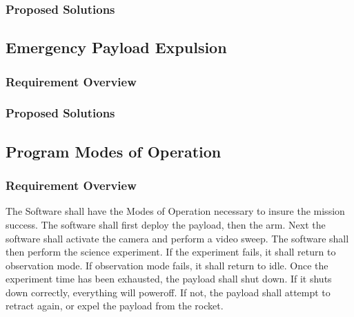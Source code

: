 \documentclass[letterpaper,10pt]{article}
\begin{document}
\subsubsection{Proposed Solutions}

\subsection{Emergency Payload Expulsion}
\subsubsection{Requirement Overview}
\subsubsection{Proposed Solutions}
\subsection{Program Modes of Operation}
\subsubsection{Requirement Overview}
The Software shall have the Modes of Operation necessary to insure the mission success.
The software shall first deploy the payload, then the arm. Next the software shall activate the 
camera and perform a video sweep. The software shall then perform the science experiment.
If the experiment fails, it shall return to observation mode.
If observation mode fails, it shall return to idle.
Once the experiment time has been exhausted, the payload shall shut down.
If it shuts down correctly, everything will poweroff. If not, the payload shall attempt to retract 
again, or expel the payload from the rocket.
\end{document}
